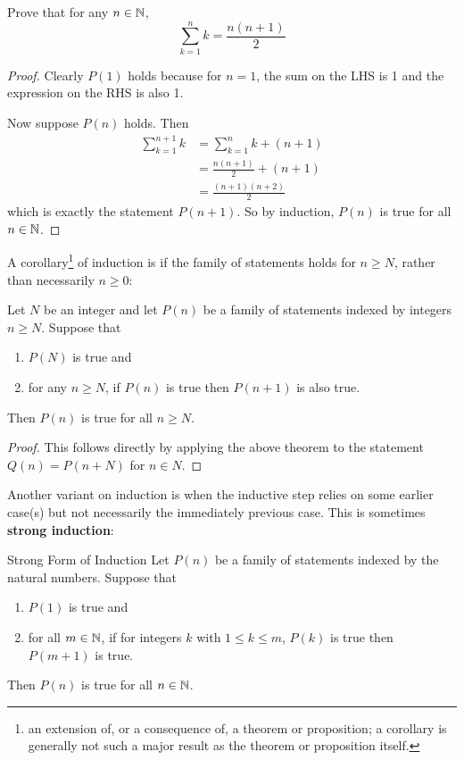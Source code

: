 \begin{exmp}{}{}
Prove that for any $n \in \mathbb N$,
\[ \sum_{k=1}^n k = \frac{n(n+1)}{2} \]
\end{exmp}

\begin{proof}
Clearly $P(1)$ holds because for $n=1$, the sum on the LHS is 1 and the expression on the RHS is also 1.

Now suppose $P(n)$ holds. Then
\begin{align*}
\sum_{k=1}^{n+1} k &= \sum_{k=1}^n k + (n+1) \\
&= \frac{n(n+1)}{2} + (n+1) \\
&= \frac{(n+1)(n+2)}{2}
\end{align*}
which is exactly the statement $P(n+1)$. So by induction, $P(n)$ is true for all $n \in \mathbb N$.
\end{proof}

A corollary\footnote{an extension of, or a consequence of, a theorem or proposition; a corollary is generally not such a major result as the theorem or proposition itself.} of induction is if the family of statements holds for $n \ge N$, rather than necessarily $n \ge 0$:

\begin{corollary}
Let $N$ be an integer and let $P(n)$ be a family of statements indexed by integers $n \ge N$. Suppose that 
\begin{enumerate}[label=(\roman*)]
\item $P(N)$ is true and
\item for any $n \ge N$, if $P(n)$ is true then $P(n+1)$ is also true. 
\end{enumerate}
Then $P(n)$ is true for all $n \ge N$.
\end{corollary}

\begin{proof}
This follows directly by applying the above theorem to the statement $Q(n) = P(n+N)$ for $n \in N$.
\end{proof}

Another variant on induction is when the inductive step relies on some earlier case(s) but not necessarily the immediately previous case. This is sometimes \textbf{strong induction}:

\begin{thrm}{Strong Form of Induction}{}
Let $P(n)$ be a family of statements indexed by the natural numbers. Suppose that
\begin{enumerate}[label=(\roman*)]
\item $P(1)$ is true and
\item for all $m \in \mathbb N$, if for integers $k$ with $1 \le k \le m$, $P(k)$ is true then $P(m+1)$ is true.
\end{enumerate}
Then $P(n)$ is true for all $n \in \mathbb N$.
\end{thrm}

